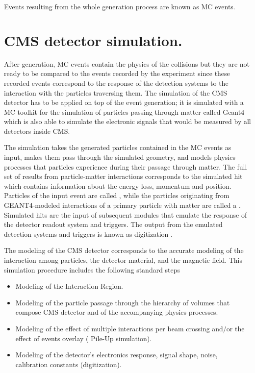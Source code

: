 Events resulting from the whole generation process are known as MC events. 

\section{CMS detector simulation.}

After generation, MC events contain the physics of the collisions but they are not ready to be compared to the events recorded by the experiment since these recorded events correspond to the response of the detection systems to the interaction with the particles traversing them. The simulation of the CMS detector has to be applied on top of the event generation; it is simulated with a MC toolkit for the simulation of particles passing through matter called Geant4 which is also able to simulate the electronic signals that would be measured by all detectors inside CMS.   

The simulation takes the generated particles contained in the MC events as input, makes them pass through the simulated geometry, and models physics processes that particles experience during their passage through matter. The full set of results from particle-matter interactions corresponds to the simulated hit which contains information about the energy loss, momentum and position. Particles of the input event are called , while the particles originating from GEANT4-modeled interactions of a primary particle with matter are called a .  Simulated hits are the input of subsequent modules that emulate the response of the detector readout system and triggers. The output from the emulated detection systems and triggers is known as digitization \cite{geant,geant2}.

The modeling of the CMS detector corresponds to the accurate modeling of the interaction among particles, the detector material, and the magnetic field. This simulation procedure includes the following standard steps
\begin{itemize}
\item Modeling of the Interaction Region.
\item Modeling of the particle passage through the hierarchy of volumes that compose CMS detector and of the accompanying physics processes.
\item Modeling of the effect of multiple interactions per beam crossing and/or the effect of events overlay ( Pile-Up simulation).
\item Modeling of the detector's electronics response, signal shape, noise, calibration constants (digitization). 
\end{itemize}

